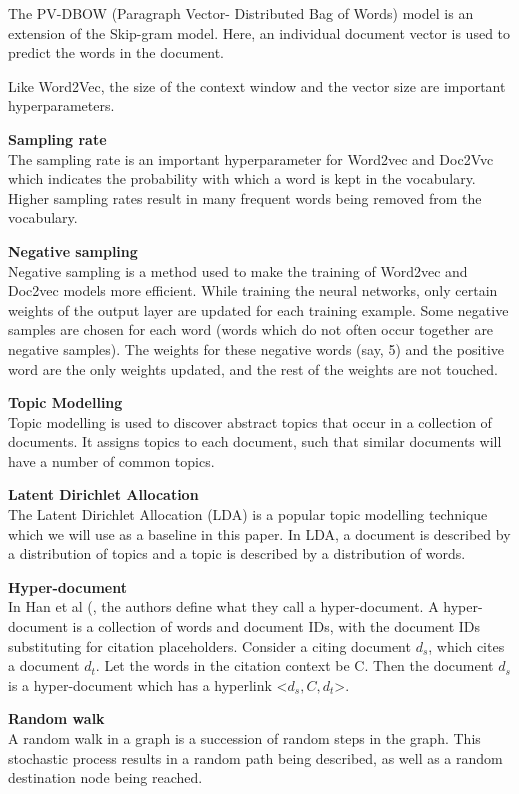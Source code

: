 The PV-DBOW (Paragraph Vector- Distributed Bag of Words) model is an extension of the Skip-gram model. Here, an individual document vector is used to predict the words in the document. 

Like Word2Vec, the size of the context window and the vector size are important hyperparameters. 

\textbf{Sampling rate}\\
The sampling rate is an important hyperparameter for Word2vec and Doc2Vvc which indicates the probability with which a word is kept in the vocabulary. Higher sampling rates result in many frequent words being removed from the vocabulary. 

\textbf{Negative sampling}\\
Negative sampling \cite{MikolovNegsamp} is a method used to make the training of Word2vec and Doc2vec models more efficient. While training the neural networks, only certain weights of the output layer are updated for each training example. Some negative samples are chosen for each word (words which do not often occur together are negative samples). The weights for these negative words (say, 5) and the positive word are the only weights updated, and the rest of the weights are not touched.

\textbf{Topic Modelling}\\
Topic modelling is used to discover abstract topics that occur in a collection of documents. It assigns topics to each document, such that similar documents will have a number of common topics.

\textbf{Latent Dirichlet Allocation}\\
The Latent Dirichlet Allocation (LDA) \cite{BleiNJ03} is a popular topic modelling technique which we will use as a baseline in this paper. In LDA, a document is described by a distribution of topics and a topic is described by a distribution of words. 

\textbf{Hyper-document}\\
In Han et al (\cite{ShiSZZH18}, the authors define what they call a hyper-document. A hyper-document is a collection of words and document IDs, with the document IDs substituting for citation placeholders. Consider a citing document $d_s$, which cites a document $d_t$. Let the words in the citation context be C. Then the document $d_s$ is a hyper-document which has a hyperlink <$d_s, C, d_t$>.

\textbf{Random walk}\\
A random walk in a graph is a succession of random steps in the graph. This stochastic process results in a random path being described, as well as a random destination node being reached.

